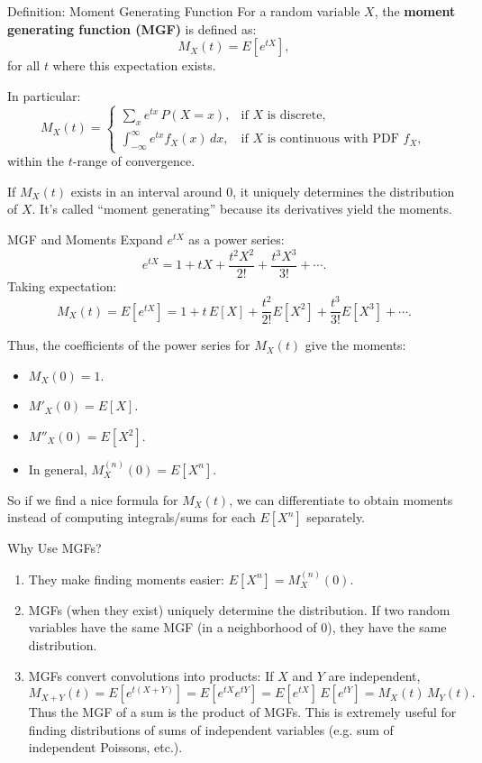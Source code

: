 \documentclass[aspectratio=169,11pt]{beamer} %
\begin{document}
\begin{frame}{Definition: Moment Generating Function}
For a random variable $X$, the \textbf{moment generating function (MGF)} is defined as:
\[ M_X(t) = E[e^{tX}], \]
for all $t$ where this expectation exists. \newline

In particular:
\[ 
M_X(t) = 
\begin{cases}
\sum_x e^{t x}\, P(X=x), & \text{if $X$ is discrete},\\
\int_{-\infty}^{\infty} e^{t x} f_X(x)\,dx, & \text{if $X$ is continuous with PDF $f_X$},
\end{cases}
\] 
within the $t$-range of convergence.

If $M_X(t)$ exists in an interval around 0, it uniquely determines the distribution of $X$. It's called “moment generating” because its derivatives yield the moments.
\end{frame}

\begin{frame}{MGF and Moments}
Expand $e^{tX}$ as a power series:
\[ e^{tX} = 1 + tX + \frac{t^2 X^2}{2!} + \frac{t^3 X^3}{3!} + \cdots. \]
Taking expectation:
\[ M_X(t) = E[e^{tX}] = 1 + t\,E[X] + \frac{t^2}{2!}E[X^2] + \frac{t^3}{3!}E[X^3] + \cdots. \]

Thus, the coefficients of the power series for $M_X(t)$ give the moments:
\begin{itemize}
    \item $M_X(0) = 1$.
    \item $M'_X(0) = E[X]$.
    \item $M''_X(0) = E[X^2]$.
    \item In general, $M_X^{(n)}(0) = E[X^n]$.
\end{itemize}

So if we find a nice formula for $M_X(t)$, we can differentiate to obtain moments instead of computing integrals/sums for each $E[X^n]$ separately.
\end{frame}

\begin{frame}{Why Use MGFs?}
\begin{enumerate}
    \item They make finding moments easier: $E[X^n] = M_X^{(n)}(0)$.
    \item MGFs (when they exist) uniquely determine the distribution. If two random variables have the same MGF (in a neighborhood of 0), they have the same distribution.
    \item MGFs convert convolutions into products: If $X$ and $Y$ are independent, 
    \[M_{X+Y}(t) = E[e^{t(X+Y)}] = E[e^{tX}e^{tY}] = E[e^{tX}]\,E[e^{tY}] = M_X(t)\,M_Y(t).\] 
    Thus the MGF of a sum is the product of MGFs. This is extremely useful for finding distributions of sums of independent variables (e.g. sum of independent Poissons, etc.).
\end{enumerate}
\end{frame}
\end{document}
